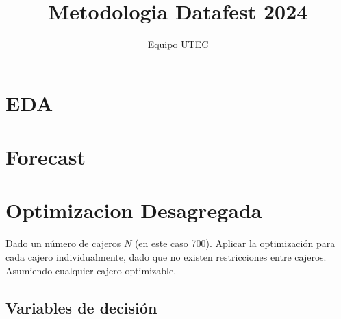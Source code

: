 \documentclass{article}
\begin{document}
\title{Metodologia Datafest 2024}
\author{Equipo UTEC}

\maketitle

\tableofcontents

\section{EDA}

\section{Forecast}

\section{Optimizacion Desagregada}


Dado un número de cajeros $N$ (en este caso 700). Aplicar la optimización para cada cajero individualmente, dado que no existen restricciones entre cajeros. Asumiendo cualquier cajero optimizable.

\subsection{Variables de decisión}
\end{document}
